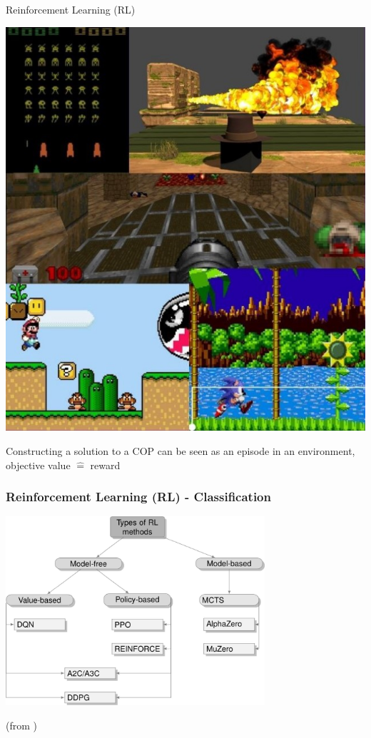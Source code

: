 \documentclass[aspectratio=1610]{beamer}
\newcommand{\important}[1]{{\color{green!60!black}#1}}
\renewcommand{\footnotesize}{\scriptsize}
\begin{document}
\begin{frame}{Reinforcement Learning (RL)}
\begin{itemize}
\begin{minipage}[c]{0.20\textwidth}
				\includegraphics[width=\linewidth]{figures/compgames.jpg}
			\end{minipage}

		\vspace{2ex}
		\important{Constructing a solution to a COP can be seen as an episode in an environment, objective value $\hat=$ reward}
	\end{itemize}
\end{frame}


\begin{frame}
	\frametitle{Reinforcement Learning (RL) - Classification}
	\begin{center}
		\includegraphics[width=0.72\textwidth]{figures/rlmethods.jpg}

		\bigskip
		\footnotesize{(from \citet{mazyavkina-21b})}
	\end{center}
\end{frame}
\end{document}
